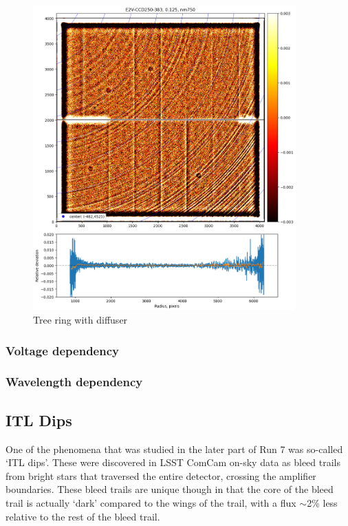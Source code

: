 \begin{figure}
\begin{centering}
\includegraphics[width=0.9\textwidth]{figures/TR_w_diffuser.png}
\end{centering}
\caption{Tree ring with diffuser}
\end{figure}


\subsubsection{Voltage dependency}
\subsubsection{Wavelength dependency}


\subsection{ITL Dips}\label{itl-dips}

One of the phenomena that was studied in the later part of Run 7 was so-called 
`ITL dips'. These were discovered in LSST ComCam on-sky data as
bleed trails from bright stars that traversed the entire detector,
crossing the amplifier boundaries. These bleed trails are unique
though in that the core of the bleed trail is actually `dark'
compared to the wings of the trail, with a flux $\sim$2\% less relative to the rest of the
bleed trail.

